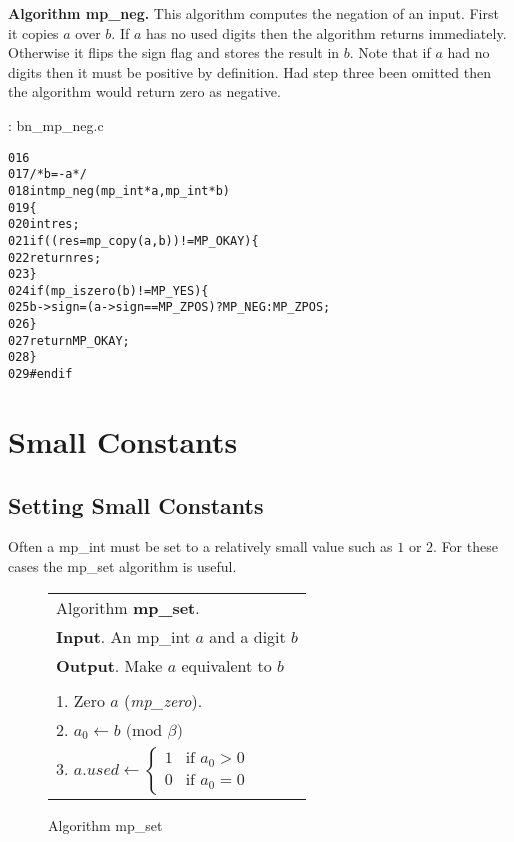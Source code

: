 \documentclass[b5paper]{book}
\begin{document}
\textbf{Algorithm mp\_neg.}
This algorithm computes the negation of an input.  First it copies $a$ over $b$.  If $a$ has no used digits then
the algorithm returns immediately.  Otherwise it flips the sign flag and stores the result in $b$.  Note that if 
$a$ had no digits then it must be positive by definition.  Had step three been omitted then the algorithm would return
zero as negative.

\vspace{+3mm}\begin{small}
\hspace{-5.1mm}{\bf File}: bn\_mp\_neg.c
\vspace{-3mm}
\begin{alltt}
016   
017   /* b = -a */
018   int mp_neg (mp_int * a, mp_int * b)
019   \{
020     int     res;
021     if ((res = mp_copy (a, b)) != MP_OKAY) \{
022       return res;
023     \}
024     if (mp_iszero(b) != MP_YES) \{
025        b->sign = (a->sign == MP_ZPOS) ? MP_NEG : MP_ZPOS;
026     \}
027     return MP_OKAY;
028   \}
029   #endif
\end{alltt}
\end{small}

\section{Small Constants}
\subsection{Setting Small Constants}
Often a mp\_int must be set to a relatively small value such as $1$ or $2$.  For these cases the mp\_set algorithm is useful.

\begin{figure}[here]
\begin{center}
\begin{tabular}{l}
\hline Algorithm \textbf{mp\_set}. \\
\textbf{Input}.   An mp\_int $a$ and a digit $b$ \\
\textbf{Output}.  Make $a$ equivalent to $b$ \\
\hline \\
1.  Zero $a$ (\textit{mp\_zero}). \\
2.  $a_0 \leftarrow b \mbox{ (mod }\beta\mbox{)}$ \\
3.  $a.used \leftarrow  \left \lbrace \begin{array}{ll}
                              1 &  \mbox{if }a_0 > 0 \\
                              0 &  \mbox{if }a_0 = 0 
                              \end{array} \right .$ \\
\hline                              
\end{tabular}
\end{center}
\caption{Algorithm mp\_set}
\end{figure}
\end{document}
